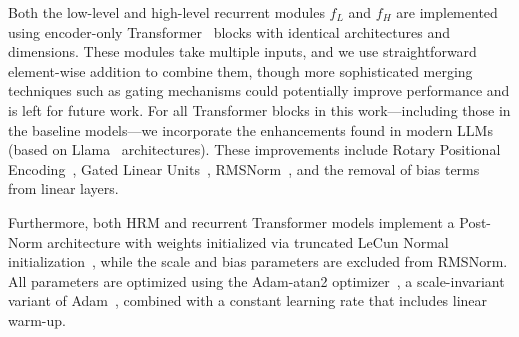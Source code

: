 Both the low-level and high-level recurrent modules $f_L$ and $f_H$ are implemented using encoder-only Transformer~\cite{vaswani2017attention} blocks with identical architectures and dimensions. 
These modules take multiple inputs, and we use straightforward element-wise addition to combine them, though more sophisticated merging techniques such as gating mechanisms could potentially improve performance and is left for future work. For all Transformer blocks in this work---including those in the baseline models---we incorporate the enhancements found in modern LLMs (based on Llama~\cite{meta2024llama3} architectures). These improvements include Rotary Positional Encoding~\citep{SHLPBL-2024}, Gated Linear Units~\cite{Shazeer2020GLUVI}, RMSNorm~\cite{Zhang2019RootMS}, and the removal of bias terms from linear layers. 

Furthermore, both HRM and recurrent Transformer models implement a Post-Norm architecture with weights initialized via truncated LeCun Normal initialization~\cite{Klambauer2017SelfNormalizingNN, jax_lecun_normal_initializer,lecun2002efficient}, while the scale and bias parameters are excluded from RMSNorm. All parameters are optimized using the Adam-atan2 optimizer~\citep{EXWANLGSKLP-2024}, a scale-invariant variant of Adam~\citep{KB-2017}, combined with a constant learning rate that includes linear warm-up.